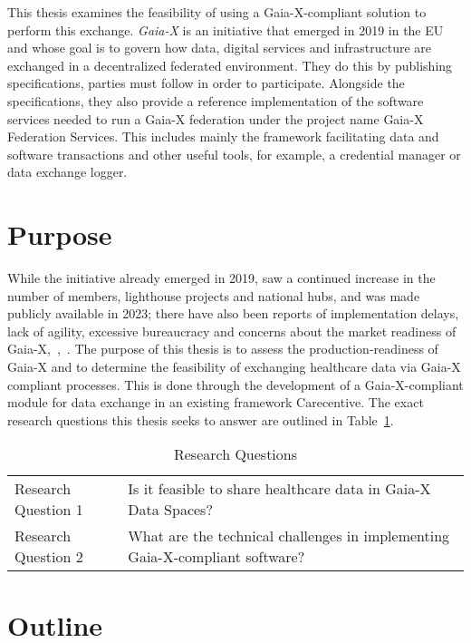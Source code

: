 This thesis examines the feasibility of using a Gaia-X-compliant solution to perform this exchange.
\textit{Gaia-X}\cite{gaiax} is an initiative that emerged in 2019 in the EU and whose goal is to govern how data, digital services and infrastructure are exchanged in a decentralized federated environment.
They do this by publishing specifications, parties must follow in order to participate.
Alongside the specifications, they also provide a reference implementation of the software services needed to run a Gaia-X federation under the project name Gaia-X Federation Services\cite{gxfs}.
This includes mainly the framework facilitating data and software transactions and other useful tools, for example, a credential manager or data exchange logger.

\section{Purpose}\label{sec:purpose}

While the initiative already emerged in 2019, saw a continued increase in the number of members, lighthouse projects and national hubs, and was made publicly available in 2023; there have also been reports of implementation delays, lack of agility, excessive bureaucracy and concerns about the market readiness of Gaia-X\cite{say_gaia-x_2024},~\cite{noauthor_inside_2021},~\cite{eichberger_why_2021}.
The purpose of this thesis is to assess the production-readiness of Gaia-X and to determine the feasibility of exchanging healthcare data via Gaia-X compliant processes.
This is done through the development of a Gaia-X-compliant module for data exchange in an existing framework Carecentive\cite{carecentive}.
The exact research questions this thesis seeks to answer are outlined in Table~\ref{tab:research-questions}.

\begin{table}
    \centering
    {\renewcommand{\arraystretch}{1.7}
        \begin{tabular}{ p{4cm}|p{11cm} }
            Research Question 1 & Is it feasible to share healthcare data in Gaia-X Data Spaces?\\
            \hhline{--}
            Research Question 2 & What are the technical challenges in implementing Gaia-X-compliant software?
        \end{tabular}
    }
    \caption{Research Questions}
    \label{tab:research-questions}
\end{table}

\section{Outline}\label{sec:outline}

